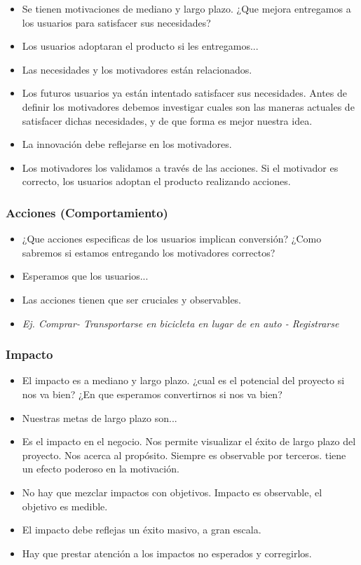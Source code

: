 \documentclass[titlepage,a4paper]{article}
\begin{document}
\begin{itemize}
    \item Se tienen motivaciones de mediano y largo plazo. ¿Que mejora entregamos a los usuarios para satisfacer sus necesidades? 
    \item Los usuarios adoptaran el producto si les entregamos...
    \item Las necesidades y los motivadores están relacionados.
    \item Los futuros usuarios ya están intentado satisfacer sus necesidades. Antes de definir los motivadores debemos investigar cuales son las maneras actuales de satisfacer dichas necesidades, y de que forma es mejor nuestra idea.
    \item La innovación debe reflejarse en los motivadores. 
    \item Los motivadores los validamos a través de las acciones. Si el motivador es correcto, los usuarios adoptan el producto realizando acciones.
\end{itemize}

\subsubsection*{Acciones (Comportamiento)}

\begin{itemize}
    \item ¿Que acciones especificas de los usuarios implican conversión? ¿Como sabremos si estamos entregando los motivadores correctos?
    \item Esperamos que los usuarios...
    \item Las acciones tienen que ser cruciales y observables.
    \item \textit{Ej. Comprar- Transportarse en bicicleta en lugar de en auto - Registrarse}
\end{itemize}

\subsubsection*{Impacto}

\begin{itemize}
    \item El impacto es a mediano y largo plazo. ¿cual es el potencial del proyecto si nos va bien? ¿En que esperamos convertirnos si nos va bien?
    \item Nuestras metas de largo plazo son...
    \item Es el impacto en el negocio. Nos permite visualizar el éxito de largo plazo del proyecto. Nos acerca al propósito. Siempre es observable por terceros. tiene un efecto poderoso en la motivación.
    \item No hay que mezclar impactos con objetivos. Impacto es observable, el objetivo es medible.
    \item El impacto debe reflejas un éxito masivo, a gran escala.
    \item Hay que prestar atención a los impactos no esperados y corregirlos.
\end{itemize}
\end{document}
